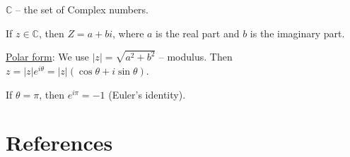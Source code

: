 \documentclass[twoside]{article}
\begin{document}
$\mathbb{C}$ -- the set of Complex numbers. 

If $z\in \mathbb{C}$, then $Z = a+b i $, where $a$ is the real part and $b$ is the imaginary part.

\underline{Polar form}: We use $|z| = \sqrt{a^2+b^2}$ -- modulus. Then $z = |z|e^{i \theta} = |z|({\cos \theta + i \sin \theta})$.

If $\theta = \pi$, then $e^{i\pi} = -1$ (Euler's identity).


























































\clearpage
\section*{References}

\end{document}
